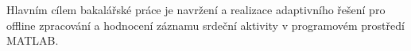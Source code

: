 Hlavním cílem bakalářské práce je navržení a realizace adaptivního řešení pro
offline zpracování a hodnocení záznamu srdeční aktivity v programovém prostředí
MATLAB.